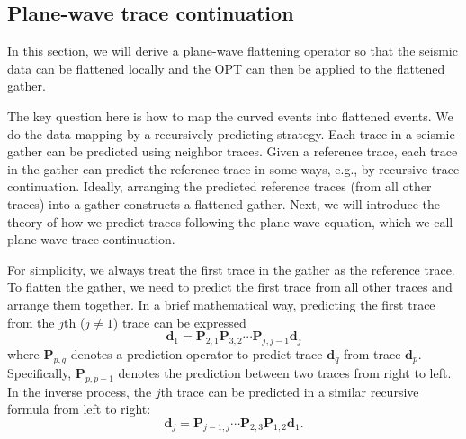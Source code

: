 
\subsection{Plane-wave trace continuation}
In this section, we will derive a plane-wave flattening operator so that the seismic data can be flattened locally and the OPT can then be applied to the flattened gather. 

The key question here is how to map the curved events into flattened events. %
We do the data mapping by a recursively predicting strategy. Each trace in a seismic gather can be predicted using neighbor traces. Given a reference trace, each trace in the gather can predict the reference trace in some ways, e.g., by recursive trace continuation. Ideally, arranging the predicted reference traces (from all other traces) into a gather constructs a flattened gather. Next, we will introduce the theory of how we predict traces following the plane-wave equation, which we call plane-wave trace continuation.

For simplicity, we always treat the first trace in the gather as the reference trace. To flatten the gather, we need to predict the first trace from all other traces and arrange them together. In a brief mathematical way, predicting the first trace from the $j$th ($j\ne 1$) trace can be expressed 
\begin{equation}
\label{eq:recur1}
\mathbf{d}_1=\mathbf{P}_{2,1}\mathbf{P}_{3,2}\cdots\mathbf{P}_{j,j-1}\mathbf{d}_{j} 
\end{equation}
where $\mathbf{P}_{p,q}$ denotes a prediction operator to predict trace $\mathbf{d}_q$ from trace $\mathbf{d}_p$. Specifically, $\mathbf{P}_{p,p-1}$ denotes the prediction between two traces from right to left. In the inverse process, the $j$th trace can be predicted in a similar recursive formula from left to right:
\begin{equation}
\label{eq:recur2}
\mathbf{d}_j=\mathbf{P}_{j-1,j}\cdots\mathbf{P}_{2,3}\mathbf{P}_{1,2}\mathbf{d}_{1}. 
\end{equation}


